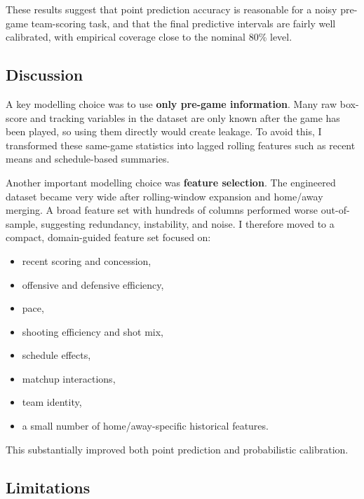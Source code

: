 \documentclass{article}
\begin{document}
These results suggest that point prediction accuracy is reasonable for a noisy pre-game team-scoring task, and that the final predictive intervals are fairly well calibrated, with empirical coverage close to the nominal 80\% level.

\subsection{Discussion}

A key modelling choice was to use \textbf{only pre-game information}. Many raw box-score and tracking variables in the dataset are only known after the game has been played, so using them directly would create leakage. To avoid this, I transformed these same-game statistics into lagged rolling features such as recent means and schedule-based summaries.

Another important modelling choice was \textbf{feature selection}. The engineered dataset became very wide after rolling-window expansion and home/away merging. A broad feature set with hundreds of columns performed worse out-of-sample, suggesting redundancy, instability, and noise. I therefore moved to a compact, domain-guided feature set focused on:
\begin{itemize}
    \item recent scoring and concession,
    \item offensive and defensive efficiency,
    \item pace,
    \item shooting efficiency and shot mix,
    \item schedule effects,
    \item matchup interactions,
    \item team identity,
    \item a small number of home/away-specific historical features.
\end{itemize}

This substantially improved both point prediction and probabilistic calibration.
\subsection{Limitations}
\end{document}
